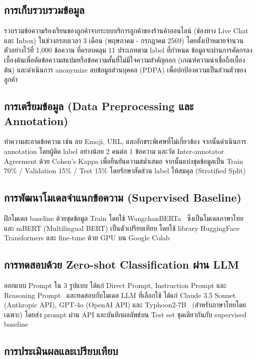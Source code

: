 \subsection{การเก็บรวบรวมข้อมูล}
    
รวบรวมข้อความร้องเรียนของลูกค้าจากระบบบริการลูกค้าของร้านค้าออนไลน์ (ช่องทาง Live Chat และ Inbox) ในช่วงกรอบเวลา 3 เดือน (พฤษภาคม - กรกฎาคม 2569) โดยตั้งเป้าหมายจำนวนตัวอย่างไว้ที่ 1,000 ข้อความ ที่ครอบคลุม 11 ประเภทตาม label ที่กำหนด ข้อมูลจะผ่านการคัดกรองเบื้องต้นเพื่อตัดข้อความสแปมหรือข้อความสั้นที่ไม่มีใจความสำคัญออก (เกณฑ์ความน่าเชื่อถือเบื้องต้น) และดำเนินการ anonymize ลบข้อมูลส่วนบุคคล (PDPA) เพื่อปกป้องความเป็นส่วนตัวของลูกค้า

\subsection{การเตรียมข้อมูล (Data Preprocessing และ Annotation)}
    
ทำความสะอาดข้อความ เช่น ลบ Emoji, URL, และอักขระพิเศษที่ไม่เกี่ยวข้อง จากนั้นดำเนินการ annotation โดยผู้ติด label อย่างน้อย 2 คนต่อ 1 ข้อความ และวัด Inter-annotator Agreement ด้วย Cohen's Kappa เพื่อยืนยันความสม่ำเสมอ จากนั้นแบ่งชุดข้อมูลเป็น Train 70\% / Validation 15\% / Test 15\% โดยรักษาสัดส่วน label ให้สมดุล (Stratified Split)

\subsection{การพัฒนาโมเดลจำแนกข้อความ (Supervised Baseline)}
    
ฝึกโมเดล baseline ด้วยชุดข้อมูล Train โดยใช้ WangchanBERTa~\cite{sriphon2025} ซึ่งเป็นโมเดลภาษาไทย และ mBERT (Multilingual BERT) เป็นตัวเปรียบเทียบ โดยใช้ library HuggingFace Transformers และ fine-tune ด้วย GPU บน Google Colab

\subsection{การทดสอบด้วย Zero-shot Classification ผ่าน LLM}
    
ออกแบบ Prompt ใน 3 รูปแบบ ได้แก่ Direct Prompt, Instruction Prompt และ Reasoning Prompt~\cite{xia2024ensembling} และทดสอบกับโมเดล LLM ที่เลือกใช้ ได้แก่ Claude 3.5 Sonnet (Anthropic API), GPT-4o (OpenAI API) และ Typhoon2-7B~\cite{sriphon2025} (สำหรับภาษาไทยโดยเฉพาะ) โดยส่ง prompt ผ่าน API และบันทึกผลลัพธ์บน Test set ชุดเดียวกันกับ supervised baseline

\subsection{การประเมินผลและเปรียบเทียบ}
    
